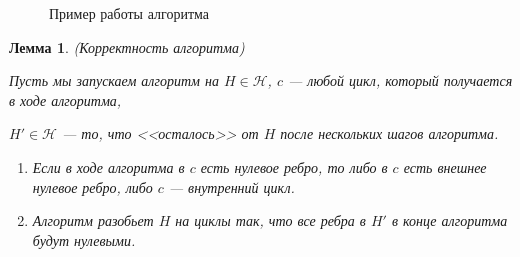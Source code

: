 \documentclass{article}
\newtheorem{lemma}{Лемма}
\begin{document}
\begin{figure}[!htb]
\begin{center}
\end{center}
\caption{Пример работы алгоритма}
\label{example_algo}
\end{figure}


\begin{lemma} (Корректность алгоритма)
\label{lemma:algo}

Пусть мы запускаем алгоритм на $H \in \mathcal{H}$, $c$ --- любой цикл, который получается в ходе алгоритма, 

$H' \in \mathcal{H}$ --- то, что <<осталось>> от $H$ после нескольких шагов алгоритма.
\begin{enumerate}
\item Если в ходе алгоритма в $c$ есть нулевое ребро, то либо в $c$ есть внешнее нулевое ребро, либо $c$ --- внутренний цикл. 
\item Алгоритм разобьет $H$ на циклы так, что все ребра в $H'$ в конце алгоритма будут нулевыми.
\end{enumerate}
\end{lemma}
\end{document}
